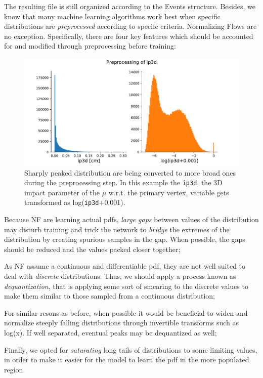 The resulting file is still organized according to the Events structure. Besides, we know that many machine learning algorithms work best when specific distributions are \emph{preprocessed} according to specifc criteria. Normalizing Flows are no exception. Specifically, there are four key features which should be accounted for and modified through preprocessing before training:

\begin{figure}
    \centering
    \includegraphics[width=\columnwidth]{gfx/ch5/preproce.pdf}
    \caption[Preprocessing]{Sharply peaked distribution are being converted to more broad ones during the preprocessing step. In this example the \texttt{ip3d}, the 3D impact parameter of the $\mu$ w.r.t. the primary vertex, variable gets transformed as log(\texttt{ip3d}+0.001).}
    \label{fig:preproce}
\end{figure}

\begin{outline}
\1 Because NF are learning actual pdfs, \emph{large gaps} between values of the distribution may disturb training and trick the network to \emph{bridge} the extremes of the distribution by creating spurious samples in the gap. When possible, the gaps should be reduced and the values packed closer together;

\1 As NF assume a continuous and differentiable pdf, they are not well suited to deal with \emph{discrete} distributions. Thus, we should apply a process known as \emph{dequantization}, that is applying some sort of smearing to the discrete values to make them similar to those sampled from a continuous distribution;

\1 For similar resons as before, when possible it would be beneficial to widen and normalize steeply falling distributions through invertible transforms such as log(x). If well separated, eventual peaks may be dequantized as well;

\1 Finally, we opted for \emph{saturating} long tails of distributions to some limiting values, in order to make it easier for the model to learn the pdf in the more populated region.
\end{outline}


